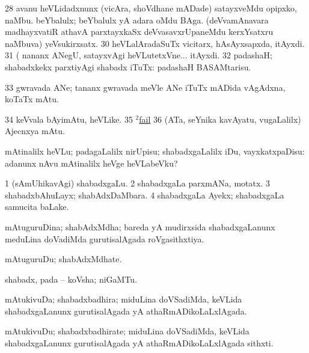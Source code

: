 \num{28}  avanu heVLidadxnunx (vicAra, shoVdhane mADade) satayxveMdu opipxko, naMbu. 
  
\banum
{} beYbalulx; beYbalulx yA adara oMdu BAga. 
 (deVvamAnavara madhayxvatiR athavA parxtayxkaSx deVvasavxrUpaneMdu kerxYsatxru naMbuva) yeVsukirxsatx. 
\eanum
\numie
\num{30}  heVLalAradaSuTx vicitarx, hAsAyxsapxda, itAyxdi. 
\num{31}  (  nananx ANegU, satayxvAgi heVLutetxVne... itAyxdi. 
\num{32}  padashaH; shabadxkekx parxtiyAgi shabadx iTuTx:  padashaH BASAMtarisu. 
\num{33}  gwravada ANe; tananx gwravada meVle ANe iTuTx mADida vAgAdxna, koTaTx mAtu. 
\num{34}  keVvala bAyimAtu, heVLike. 
\num{35}  \hyperref{kandict_f.pdf}{F}{fail(2) nuga}{$^2$fail}  
\num{36}  (ATa, seYnika kavAyatu, \mo vugaLalilx) Ajecnxya mAtu. 
\enum
\emng
\eentry

\bentry
{} 
\gl{\sakirx}
\expl{}
\bmng
mAtinalilx heVLu; padagaLalilx nirUpisu; shabadxgaLalilx iDu, vayxkatxpaDisu:  adanunx nAvu mAtinalilx heVge heVLabeVku? 
\emng
\eentry

\bentry
{} 
\gl{\nA}
\expl{}
\bmng
\bnum
\num{1} (sAmUhikavAgi) shabadxgaLu. 
\num{2} shabadxgaLa parxmANa, motatx. 
\num{3} shabadxbAhuLayx; shabAdxDaMbara. 
\num{4} shabadxgaLa Ayekx; shabadxgaLa samucita baLake. 
\enum
\emng
\eentry

\bentry
{} 
\gl{\gu}
\expl{}
\bmng
mAtuguruDina; shabAdxMdha; bareda yA mudirxsida shabadxgaLanunx meduLina doVadiMda gurutisalAgada roVgasithxtiya. 
\emng
\eentry

\bentry
{} 
\gl{\nA}
\expl{}
\bmng
mAtuguruDu; shabAdxMdhate. 
\emng
\eentry

\bentry
{} 
\gl{\nA}
\expl{}
\bmng
shabadx, pada -- koVsha; niGaMTu. 
\emng
\eentry

\bentry
{} 
\gl{\gu}
\expl{}
\bmng
mAtukivuDa; shabadxbadhira; miduLina doVSadiMda, keVLida shabadxgaLanunx gurutisalAgada yA athaRmADikoLaLxlAgada. 
\emng
\eentry

\bentry
{} 
\gl{\nA}
\expl{}
\bmng
mAtukivuDu; shabadxbadhirate; miduLina doVSadiMda, keVLida shabadxgaLanunx gurutisalAgada yA athaRmADikoLaLxlAgada sithxti. 
\emng
\eentry

